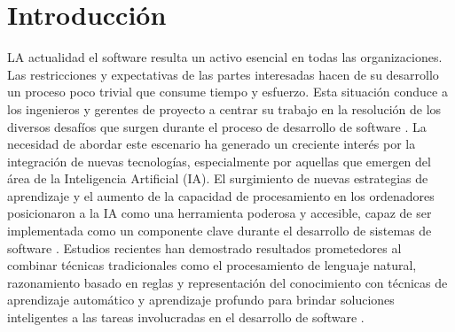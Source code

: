 \documentclass[journal]{IEEEtran}
\begin{document}
%
\IEEEpeerreviewmaketitle



\section{Introducci\'on}
% 
% 
% 
% 
 LA actualidad el software resulta un activo esencial en todas las organizaciones. Las restricciones y expectativas de las partes interesadas hacen de su desarrollo un proceso poco trivial que consume tiempo y esfuerzo. Esta situación conduce a los ingenieros y gerentes de proyecto a centrar su trabajo en la resolución de los diversos desafíos que surgen durante el proceso de desarrollo de software \cite{Asghar2010}. La necesidad de abordar este escenario ha generado un creciente interés por la integración de nuevas tecnologías, especialmente por aquellas que emergen del área de la Inteligencia Artificial (IA). El surgimiento de nuevas estrategias de aprendizaje y el aumento de la capacidad de procesamiento en los ordenadores posicionaron a la IA como una herramienta poderosa y accesible, capaz de ser implementada como un componente clave durante el desarrollo de sistemas de software \cite{feldt2018ways}. Estudios recientes han demostrado resultados prometedores al combinar técnicas tradicionales como el procesamiento de lenguaje natural, razonamiento basado en reglas y representación del conocimiento con técnicas de aprendizaje automático y aprendizaje profundo para brindar soluciones inteligentes a las tareas involucradas en el desarrollo de software \cite{giudice2016ai}. 
\end{document}
